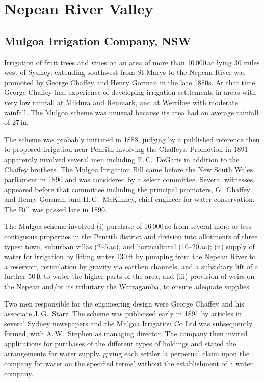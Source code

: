 \section*{Nepean River Valley}

\subsection*{Mulgoa Irrigation Company, NSW}

Irrigation of fruit trees and vines on an area of more than
10\,000\,ac lying 30 miles west of Sydney, extending southwest from St
Marys to the Nepean River was promoted by George Chaffey and Henry
Gorman in the late 1880s.  At that time George Chaffey had experience
of developing irrigation settlements in areas with very low rainfall
at Mildura and Renmark, and at Werribee with moderate rainfall.  The
Mulgoa scheme was unusual because its area had an average rainfall of
27\,in.

The scheme was probably initiated in 1888, judging by a published
reference then to proposed irrigation near Penrith involving the
Chaffeys.  Promotion in 1891 apparently involved several men including
E.\,C.~DeGaris in addition to the Chaffey brothers.  The Mulgoa
Irrigation Bill came before the New South Wales parliament in 1890 and
was considered by a select committee.  Several witnesses appeared
before that committee including the principal promoters, G.~Chaffey
and Henry Gorman, and H.\,G.~McKinney, chief engineer for water
conservation.  The Bill was passed late in 1890.

The Mulgoa scheme involved (i) purchase of 16\,000\,ac from several
more or less contiguous properties in the Penrith district and
division into allotments of three types: town, suburban villas
(2--5\,ac), and horticultural (10--20\,ac); (ii) supply of water for
irrigation by lifting water 130\,ft by pumping from the Nepean River
to a reservoir, reticulation by gravity via earthen channels, and a
subsidiary lift of a further 50\,ft to water the higher parts of the
area; and (iii) provision of weirs on the Nepean and/or its tributary
the Warragamba, to ensure adequate supplies.

Two men responsible for the engineering design were George Chaffey and
his associate J.\,G.~Starr.  The scheme was publicised early in 1891 by
articles in several Sydney newspapers and the Mulgoa Irrigation Co Ltd
was subsequently formed, with A.\,W.~Stephen as managing director.
The company then invited applications for purchases of the different
types of holdings and stated the arrangements for water supply, giving
each settler `a perpetual claim upon the company for water on the
specified terms' without the establishment of a water
company.


